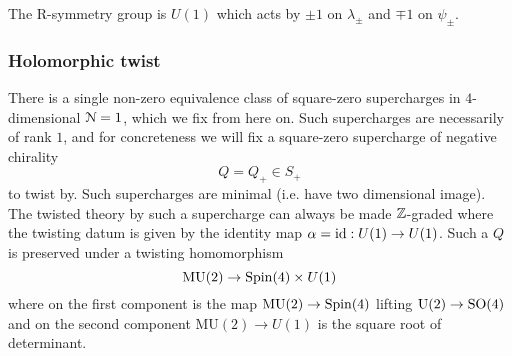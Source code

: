 \documentclass[10pt, oneside]{article}
\newcommand{\MU}{\mathrm{MU}}
\renewcommand{\U}{\mathrm{U}}
\begin{document}
The R-symmetry group is $U(1)$ which acts by $\pm 1$ on $\lambda_{\pm}$ and $\mp 1$ on $\psi_{\pm}$. 

\subsubsection{Holomorphic twist}

There is a single non-zero equivalence class of square-zero supercharges in $4$-dimensional $\mathcal{N} = 1$, which we fix from here on.
Such supercharges are necessarily of rank $1$, and for concreteness we will fix a square-zero supercharge of negative chirality $$Q = Q_+ \in S_+$$ to twist by. 
Such supercharges are minimal (i.e. have two dimensional image).  
The twisted theory by such a supercharge can always be made $\mathbb Z$-graded where the twisting datum is given by the identity map $\alpha = {\rm id} : U(1) \to U(1)$. 
Such a $Q$ is preserved under a twisting homomorphism
\[
\MU(2) \to {\rm Spin}(4) \times U(1) 
\]
where on the first component is the map $\MU(2) \to {\rm Spin}(4)$ lifting $\U(2) \to \SO(4)$ and on the second component $\MU(2) \to U(1)$ is the square root of determinant. 
\end{document}
